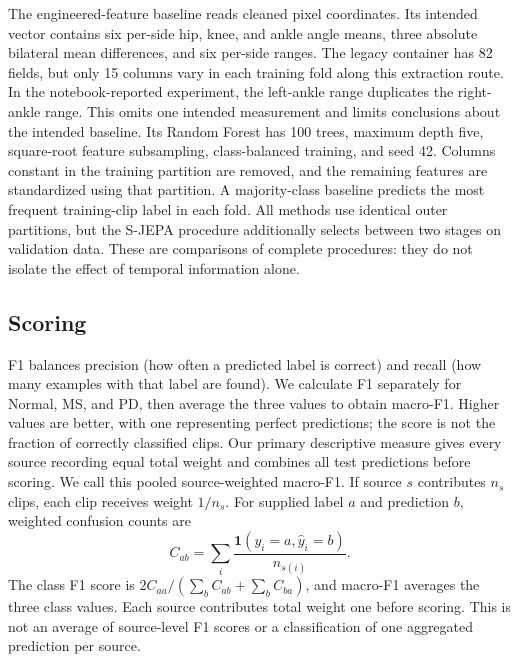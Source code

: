 \documentclass[10pt,twocolumn,letterpaper]{article}
\begin{document}
The engineered-feature baseline reads cleaned pixel coordinates. Its intended vector contains six per-side hip, knee, and ankle angle means, three absolute bilateral mean differences, and six per-side ranges. The legacy container has 82 fields, but only 15 columns vary in each training fold along this extraction route. In the notebook-reported experiment, the left-ankle range duplicates the right-ankle range. This omits one intended measurement and limits conclusions about the intended baseline. Its Random Forest has 100 trees, maximum depth five, square-root feature subsampling, class-balanced training, and seed 42. Columns constant in the training partition are removed, and the remaining features are standardized using that partition. A majority-class baseline predicts the most frequent training-clip label in each fold. All methods use identical outer partitions, but the S-JEPA procedure additionally selects between two stages on validation data. These are comparisons of complete procedures: they do not isolate the effect of temporal information alone.

\subsection{Scoring}
F1 balances precision (how often a predicted label is correct) and recall (how many examples with that label are found). We calculate F1 separately for Normal, MS, and PD, then average the three values to obtain macro-F1. Higher values are better, with one representing perfect predictions; the score is not the fraction of correctly classified clips. Our primary descriptive measure gives every source recording equal total weight and combines all test predictions before scoring. We call this pooled source-weighted macro-F1. If source $s$ contributes $n_s$ clips, each clip receives weight $1/n_s$. For supplied label $a$ and prediction $b$, weighted confusion counts are
\begin{equation}
C_{ab}=\sum_i \frac{\mathbf{1}(y_i=a,\widehat{y}_i=b)}{n_{s(i)}}.
\end{equation}
The class F1 score is $2C_{aa}/(\sum_b C_{ab}+\sum_b C_{ba})$, and macro-F1 averages the three class values. Each source contributes total weight one before scoring. This is not an average of source-level F1 scores or a classification of one aggregated prediction per source.
\end{document}

